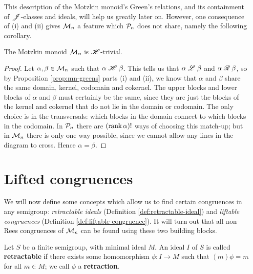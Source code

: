 This description of the Motzkin monoid's Green's relations, and its containment
of $\mathrel{\mathscr{J}}$-classes and ideals, will help us greatly later on.  However, one
consequence of (i) and (ii) gives $\mathcal{M}_n$ a feature which $\mathcal{P}_n$ does not
share, namely the following corollary.

\begin{corollary}
  \label{cor:mn-h-trivial}
  The Motzkin monoid $\mathcal{M}_n$ is $\mathrel{\mathscr{H}}$-trivial.
  \begin{proof}
    Let $\alpha, \beta \in \mathcal{M}_n$ such that $\alpha \mathrel{\mathscr{H}} \beta$.  This tells us
    that $\alpha \mathrel{\mathscr{L}} \beta$ and $\alpha \mathrel{\mathscr{R}} \beta$, so by Proposition
    \ref{prop:mn-greens} parts (i) and (ii), we know that $\alpha$ and $\beta$
    share the same domain, kernel, codomain and cokernel.  The upper blocks and
    lower blocks of $\alpha$ and $\beta$ must certainly be the same, since they
    are just the blocks of the kernel and cokernel that do not lie in the domain
    or codomain.  The only choice is in the transversals: which blocks in the
    domain connect to which blocks in the codomain.  In $\mathcal{P}_n$ there are
    $(\operatorname{rank} \alpha)!$ ways of choosing this match-up; but in $\mathcal{M}_n$ there is
    only one way possible, since we cannot allow any lines in the diagram to
    cross.  Hence $\alpha = \beta$.
  \end{proof}
\end{corollary}


\section{Lifted congruences}
\label{sec:motzkin-prelim}
We will now define some concepts which allow us to find certain
congruences in any semigroup: \textit{retractable ideals} (Definition
\ref{def:retractable-ideal}) and \textit{liftable congruences} (Definition
\ref{def:liftable-congruence}).  It will turn out that all non-Rees congruences
of $\mathcal{M}_n$ can be found using these two building blocks.

\begin{definition}
  \label{def:retractable-ideal}
   
  Let $S$ be a finite semigroup, with minimal ideal $M$.  An ideal $I$ of $S$ is
  called \textbf{retractable} if there exists some homomorphism $\phi: I \to M$
  such that $(m)\phi = m$ for all $m \in M$; we call $\phi$ a
  \textbf{retraction}.
\end{definition}

